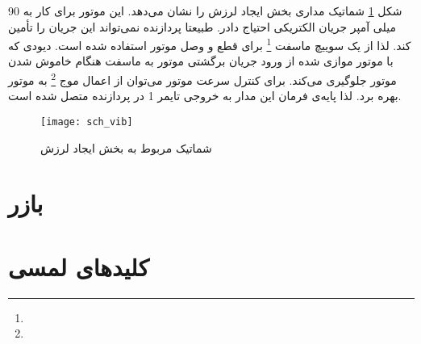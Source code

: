 شکل \ref{fig:sch-vib} شماتیک مداری بخش ایجاد لرزش را نشان می‌دهد. این موتور برای کار به 90 میلی آمپر جریان الکتریکی احتیاج دادر. طبیعتا پردازنده نمی‌تواند این جریان را تأمین کند. لذا از یک سوییچ ماسفت
\footnote{}
 برای قطع و وصل موتور استفاده شده است. دیودی که با موتور موازی شده از ورود جریان برگشتی موتور به ماسفت هنگام خاموش شدن موتور جلوگیری می‌کند. برای کنترل سرعت موتور می‌توان از اعمال موج \footnote{} به موتور بهره برد. لذا پایه‌ی فرمان این مدار به خروجی  تایمر 1 در پردازنده متصل شده است.

\begin{figure}[h]
	\centering
	\texttt{[image: sch\_vib]}
	\caption{شماتیک مربوط به بخش ایجاد لرزش}
	\label{fig:sch-vib}
\end{figure}

\section{بازر}

\section{کلیدهای لمسی}